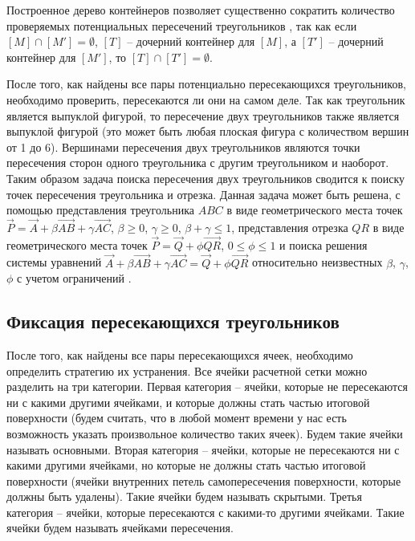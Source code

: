 Построенное дерево контейнеров позволяет существенно сократить количество проверяемых потенциальных пересечений треугольников \cite{Jung}, так как если $[M] \cap [M'] = \emptyset$, $[T]$ -- дочерний контейнер для $[M]$, а $[T']$ -- дочерний контейнер для $[M']$, то $[T] \cap [T'] = \emptyset$.

После того, как найдены все пары потенциально пересекающихся треугольников, необходимо проверить, пересекаются ли они на самом деле.
Так как треугольник является выпуклой фигурой, то пересечение двух треугольников также является выпуклой фигурой (это может быть любая плоская фигура с количеством вершин от 1 до 6).
Вершинами пересечения двух треугольников являются точки пересечения сторон одного треугольника с другим треугольником и наоборот.
Таким образом задача поиска пересечения двух треугольников сводится к поиску точек пересечения треугольника и отрезка.
Данная задача может быть решена, с помощью представления треугольника $ABC$ в виде геометрического места точек $\vec{P} = \vec{A} + \beta \vec{AB} + \gamma \vec{AC}$, $\beta \ge 0$, $\gamma \ge 0$, $\beta + \gamma \le 1$, представления отрезка $QR$ в виде геометрического места точек $\vec{P} = \vec{Q} + \phi \vec{QR}$, $0 \le \phi \le 1$ и поиска решения системы уравнений $\vec{A} + \beta \vec{AB} + \gamma \vec{AC} = \vec{Q} + \phi \vec{QR}$ относительно неизвестных $\beta$, $\gamma$, $\phi$ с учетом ограничений \cite{Freylekhman}.

\subsection{Фиксация пересекающихся треугольников}

После того, как найдены все пары пересекающихся ячеек, необходимо определить стратегию их устранения.
Все ячейки расчетной сетки можно разделить на три категории.
Первая категория -- ячейки, которые не пересекаются ни с какими другими ячейками, и которые должны стать частью итоговой поверхности (будем считать, что в любой момент времени у нас есть возможность указать произвольное количество таких ячеек).
Будем такие ячейки называть основными.
Вторая категория -- ячейки, которые не пересекаются ни с какими другими ячейками, но которые не должны стать частью итоговой поверхности (ячейки внутренних петель самопересечения поверхности, которые должны быть удалены).
Такие ячейки будем называть скрытыми.
Третья категория -- ячейки, которые пересекаются с какими-то другими ячейками. 
Такие ячейки будем называть ячейками пересечения.

